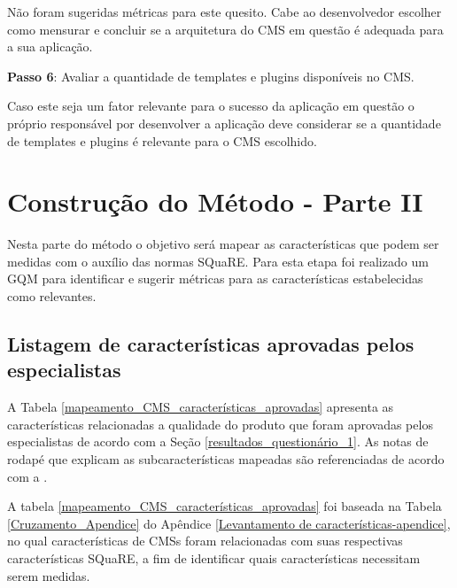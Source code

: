 Não foram sugeridas métricas para este quesito. Cabe ao desenvolvedor escolher como mensurar e concluir se a arquitetura do CMS em questão é adequada para a sua aplicação.

\textbf{Passo 6}: Avaliar a quantidade de templates e plugins disponíveis no CMS.

Caso este seja um fator relevante para o sucesso da aplicação em questão o próprio responsável por desenvolver a aplicação deve considerar se a quantidade de templates e plugins é relevante para o CMS escolhido.

\section{Construção do Método - Parte II}
\label{M-Parte-II}

Nesta parte do método o objetivo será mapear as características que podem ser medidas com o auxílio das normas SQuaRE. Para esta etapa foi realizado um GQM para identificar e sugerir métricas
para as características estabelecidas como relevantes.   


\subsection{Listagem de características aprovadas pelos especialistas}

A Tabela \ref{mapeamento_CMS_características_aprovadas} apresenta  as características relacionadas a qualidade do produto que foram aprovadas pelos especialistas de acordo com a Seção \ref{resultados_questionário_1}. 
As notas de rodapé que explicam as subcaracterísticas mapeadas são referenciadas de acordo com a .

A tabela \ref{mapeamento_CMS_características_aprovadas} foi baseada na Tabela \ref{Cruzamento_Apendice} do Apêndice \ref{Levantamento de características-apendice}, no qual características de CMSs foram relacionadas com suas respectivas características SQuaRE, a fim de identificar quais características necessitam serem medidas.
 

